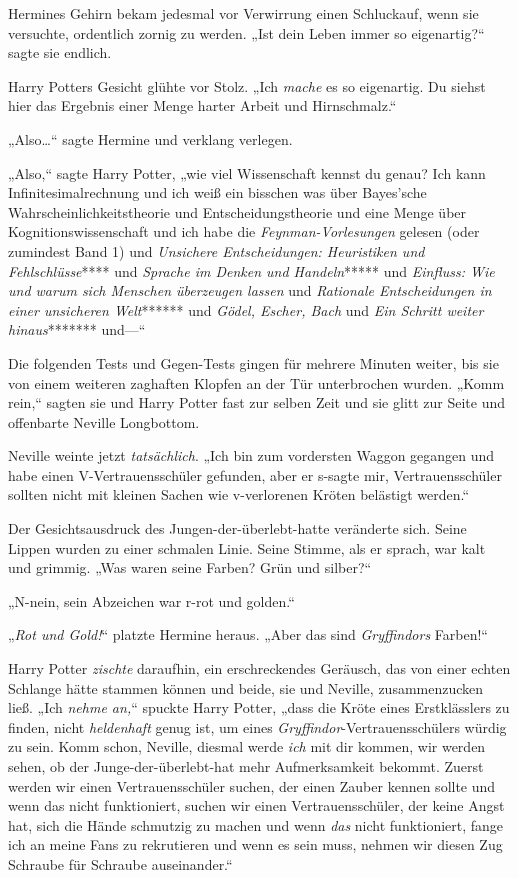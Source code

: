 {Hermines Gehirn bekam jedesmal vor Verwirrung einen Schluckauf, wenn sie versuchte, ordentlich zornig zu werden. „Ist dein Leben immer so eigenartig?“ sagte sie endlich.

Harry Potters Gesicht glühte vor Stolz. „Ich \emph{mache} es so eigenartig. Du siehst hier das Ergebnis einer Menge harter Arbeit und Hirnschmalz.“

„Also…“ sagte Hermine und verklang verlegen.

„Also,“ sagte Harry Potter, „wie viel Wissenschaft kennst du genau? Ich kann Infinitesimalrechnung und ich weiß ein bisschen was über Bayes'sche Wahrscheinlichkeitstheorie und Entscheidungstheorie und eine Menge über Kognitionswissenschaft und ich habe die \emph{Feynman-Vorlesungen} gelesen (oder zumindest Band 1) und \emph{Unsichere Entscheidungen: Heuristiken und Fehlschlüsse}**** und \emph{Sprache im Denken und Handeln}***** und \emph{Einfluss: Wie und warum sich Menschen überzeugen lassen} und \emph{Rationale Entscheidungen in einer unsicheren Welt}****** und \emph{Gödel, Escher, Bach} und \emph{Ein Schritt weiter hinaus}******* und—“

Die folgenden Tests und Gegen-Tests gingen für mehrere Minuten weiter, bis sie von einem weiteren zaghaften Klopfen an der Tür unterbrochen wurden. „Komm rein,“ sagten sie und Harry Potter fast zur selben Zeit und sie glitt zur Seite und offenbarte Neville Longbottom.

Neville weinte jetzt \emph{tatsächlich}. „Ich bin zum vordersten Waggon gegangen und habe einen V-Vertrauensschüler gefunden, aber er s-sagte mir, Vertrauensschüler sollten nicht mit kleinen Sachen wie v-verlorenen Kröten belästigt werden.“

Der Gesichtsausdruck des Jungen-der-überlebt-hatte veränderte sich. Seine Lippen wurden zu einer schmalen Linie. Seine Stimme, als er sprach, war kalt und grimmig. „Was waren seine Farben? Grün und silber?“

„N-nein, sein Abzeichen war r-rot und golden.“

„\emph{Rot und Gold!}“ platzte Hermine heraus. „Aber das sind \emph{Gryffindors} Farben!“

Harry Potter \emph{zischte} daraufhin, ein erschreckendes Geräusch, das von einer echten Schlange hätte stammen können und beide, sie und Neville, zusammenzucken ließ. „Ich \emph{nehme an,}“ spuckte Harry Potter, „dass die Kröte eines Erstklässlers zu finden, nicht \emph{heldenhaft} genug ist, um eines \emph{Gryffindor}-Vertrauensschülers würdig zu sein. Komm schon, Neville, diesmal werde \emph{ich} mit dir kommen, wir werden sehen, ob der Junge-der-überlebt-hat mehr Aufmerksamkeit bekommt. Zuerst werden wir einen Vertrauensschüler suchen, der einen Zauber kennen sollte und wenn das nicht funktioniert, suchen wir einen Vertrauensschüler, der keine Angst hat, sich die Hände schmutzig zu machen und wenn \emph{das} nicht funktioniert, fange ich an meine Fans zu rekrutieren und wenn es sein muss, nehmen wir diesen Zug Schraube für Schraube auseinander.“

}
